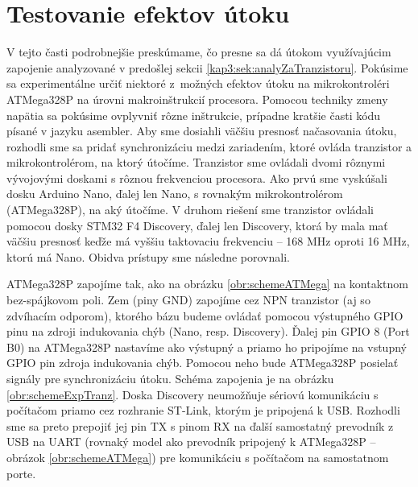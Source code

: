 \section{Testovanie efektov útoku} \label{kap3:sek:testovanieEfektov}
V tejto časti podrobnejšie preskúmame, čo presne sa dá útokom využívajúcim zapojenie analyzované v predošlej sekcii \ref{kap3:sek:analyZaTranzistoru}. Pokúsime sa experimentálne určiť niektoré z~možných efektov útoku na mikrokontroléri ATMega328P na úrovni makroinštrukcií procesora. Pomocou techniky zmeny napätia sa pokúsime ovplyvniť rôzne inštrukcie, prípadne kratšie časti kódu písané v jazyku asembler. Aby sme dosiahli väčšiu presnosť načasovania útoku, rozhodli sme sa pridať synchronizáciu medzi zariadením, ktoré ovláda tranzistor a mikrokontrolérom, na ktorý útočíme. Tranzistor sme ovládali dvomi rôznymi vývojovými doskami s rôznou frekvenciou procesora. Ako prvú sme vyskúšali dosku Arduino Nano, ďalej len Nano, s rovnakým mikrokontrolérom (ATMega328P), na aký útočíme. V druhom riešení sme tranzistor ovládali pomocou dosky STM32 F4 Discovery, ďalej len Discovery, ktorá by mala mať väčšiu presnosť keďže má vyššiu taktovaciu frekvenciu -- 168 MHz oproti 16 MHz, ktorú má Nano. Obidva prístupy sme následne porovnali.

ATMega328P zapojíme tak, ako na obrázku \ref{obr:schemeATMega} na kontaktnom bez-spájkovom poli. Zem (piny GND) zapojíme cez NPN tranzistor (aj so zdvíhacím odporom), ktorého bázu budeme ovládať pomocou výstupného GPIO pinu na zdroji indukovania chýb (Nano, resp. Discovery). Ďalej pin GPIO 8 (Port B0) na ATMega328P nastavíme ako výstupný a priamo ho pripojíme na vstupný GPIO pin zdroja indukovania chýb. Pomocou neho bude ATMega328P posielať signály pre synchronizáciu útoku. Schéma zapojenia je na obrázku \ref{obr:schemeExpTranz}. Doska Discovery neumožňuje sériovú komunikáciu s počítačom priamo cez rozhranie ST-Link, ktorým je pripojená k USB. Rozhodli sme sa preto prepojiť jej pin TX s pinom RX na ďalší samostatný prevodník z USB na UART (rovnaký model ako prevodník pripojený k ATMega328P -- obrázok \ref{obr:schemeATMega}) pre komunikáciu s počítačom na samostatnom porte.

